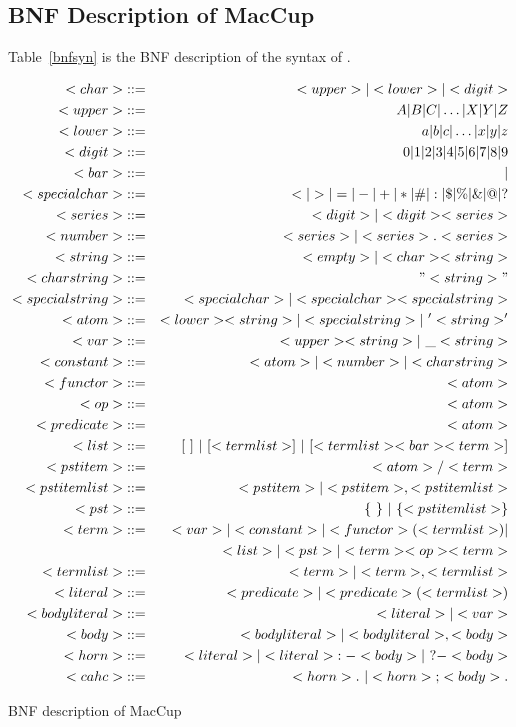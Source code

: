 \subsection{BNF Description of MacCup}
 Table~\ref{bnfsyn} is the BNF description of the syntax of \cuprolog.

\begin{table}[h]
\small
\begin{eqnarray*}
<char>& ::= &<upper> | <lower> | <digit>\\
<upper>& ::= &A|B|C| \ldots |X|Y|Z \\
<lower>& ::= &a|b|c| \ldots |x|y|z \\
<digit>& ::= &0|1|2|3|4|5|6|7|8|9 \\
<bar>& ::= & |\\
<specialchar>& ::= & <|>|=|-|+|*|\#|:|\$|\%|\&|@|? \\
<series> & ::= & <digit> | <digit><series> \\
<number>& ::= & <series> | <series>.<series> \\
<string>& ::= &<empty> | <char><string>\\
<charstring> & ::= & "<string>"\\
<specialstring>& ::= & <specialchar> | <specialchar><specialstring>\\
<atom>& ::= & <lower><string> | <specialstring> |\ '<string>' \\
<var>& ::= &<upper><string> |\  \_<string> \\
<constant>& ::= & <atom> | <number> | <charstring>\\
<functor>& ::= &<atom>\\
<op> &::=& <atom>\\
<predicate>& ::= &<atom>\\
<list> & ::= & [ \ ]\  |\  [ <term list> ]\ |\ [ <term list> <bar> <term> ] \\
<pst item> & ::= &<atom> / <term>\\
<pst item list> & ::= & <pst item> | <pst item>, <pst item list>\\
<pst>& ::= & \{\  \}\ |\ \{ <pst item list> \}\\
<term>& ::= &<var> | <constant> | <functor>(<term list>) | \\
        & & <list> | <pst> | <term> <op> <term>\\
<term list>& ::= &<term> | <term>,<term list>\\
<literal>& ::= &<predicate> | <predicate>(<term list>)\\
<body literal>& ::= & <literal> | <var>\\
<body> & ::= & <body literal> | <body literal>, <body>\\
<horn> & ::= & <literal> | <literal> {\tt :-} <body> |\ {\tt ?-} <body> \\
<cahc> & ::= & <horn>.\ | <horn> {\tt ;} <body>. \\
\end{eqnarray*}
\normalsize
\caption{BNF description of MacCup}
\label{bnfsyn}
\end{table}

